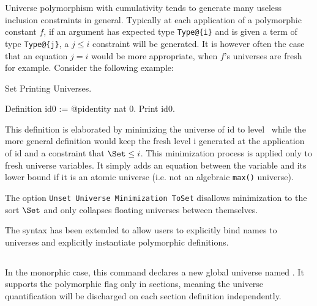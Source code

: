 
Universe polymorphism with cumulativity tends to generate many useless
inclusion constraints in general. Typically at each application of a
polymorphic constant $f$, if an argument has expected type
\verb|Type@{i}| and is given a term of type \verb|Type@{j}|, a $j \le i$
constraint will be generated. It is however often the case that an
equation $j = i$ would be more appropriate, when $f$'s
universes are fresh for example. Consider the following example:

\begin{coq_eval}
Set Printing Universes.
\end{coq_eval}
\begin{coq_example}
Definition id0 := @pidentity nat 0.
Print id0.
\end{coq_example}

This definition is elaborated by minimizing the universe of id to level
\Set~while the more general definition would keep the fresh level i
generated at the application of id and a constraint that $\Set \le i$.
This minimization process is applied only to fresh universe
variables. It simply adds an equation between the variable and its lower
bound if it is an atomic universe (i.e. not an algebraic \texttt{max()}
universe).

The option \texttt{Unset Universe Minimization ToSet} disallows
minimization to the sort $\Set$ and only collapses floating universes
between themselves.


The syntax has been extended to allow users to explicitly bind names to
universes and explicitly instantiate polymorphic definitions.

\subsection{}

In the monorphic case, this command declares a new global universe named
{\ident}. It supports the polymorphic flag only in sections, meaning the
universe quantification will be discharged on each section definition
independently.

\subsection{}

